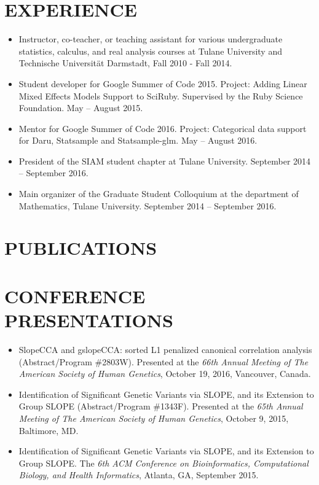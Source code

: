 \documentclass[margin]{res} %
\begin{document}
\begin{resume}
 
\section{EXPERIENCE}

\begin{itemize}
    \item Instructor, co-teacher, or teaching assistant for various undergraduate statistics, calculus, and real analysis courses at Tulane University and Technische Universit\"{a}t Darmstadt, Fall 2010 - Fall 2014.
    \item Student developer for Google Summer of Code 2015. Project: Adding Linear Mixed Effects Models Support to SciRuby. Supervised by the Ruby Science Foundation. May -- August 2015.
    \item Mentor for Google Summer of Code 2016. Project: Categorical data support for Daru, Statsample and Statsample-glm. May -- August 2016.
    \item President of the SIAM student chapter at Tulane University. September 2014 -- September 2016.
    \item Main organizer of the Graduate Student Colloquium at the department of Mathematics, Tulane University. September 2014 -- September 2016.
\end{itemize}

\section{PUBLICATIONS}


\nocite{*}

\section{CONFERENCE PRESENTATIONS}

\begin{itemize} \itemsep -2pt %
    \item SlopeCCA and gslopeCCA: sorted L1 penalized canonical correlation analysis (Abstract/Program \#2803W). Presented at the {\it 66th Annual Meeting of The American Society of Human Genetics}, October 19, 2016, Vancouver, Canada.
    \item Identification of Significant Genetic Variants via SLOPE, and its Extension to Group SLOPE (Abstract/Program \#1343F). Presented at the {\it 65th Annual Meeting of The American Society of Human Genetics}, October 9, 2015, Baltimore, MD.
  \item Identification of Significant Genetic Variants via SLOPE, and its Extension to Group SLOPE. The {\it 6th ACM Conference on Bioinformatics, Computational Biology, and Health Informatics}, Atlanta, GA, September 2015.
\end{itemize}


\end{resume}
\end{document}
